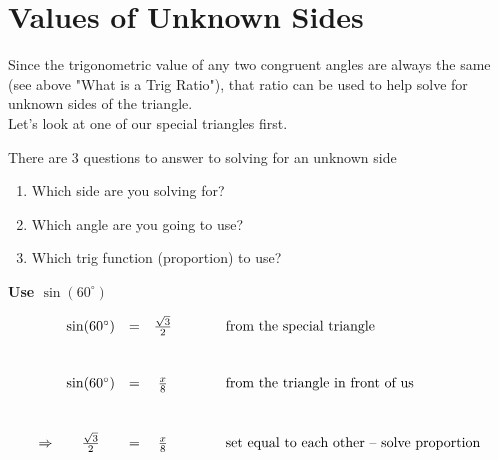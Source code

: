 \documentclass[12pt]{article}
\begin{document}
 \section*{Values of Unknown Sides}

Since the trigonometric value of any two congruent angles are always the same (see above "What is a Trig Ratio"), that ratio can be used to help solve for unknown sides of the triangle.\\

Let's look at one of our special triangles first.\\

\begin{center}
\end{center}

There are 3 questions to answer to solving for an unknown side\\

\begin{enumerate}

	\item Which side are you solving for?

	\item Which angle are you going to use?
	
	\item Which trig function (proportion) to use?\\
	

\end{enumerate}

\textbf{Use $\sin(60^\circ)$} 

\[
\begin{array}{c c c c l}
				&\sin(60^{\circ})	&		= & 	\frac{\sqrt{3}}{2}  & \hspace{1cm}\text{from the special triangle} \vspace{1cm} \\				
				&\sin(60^{\circ})	&		= & 	\frac{x}{8}  	& \hspace{1cm}  \text{from the triangle in front of us}\vspace{1cm} \\
				
	\Rightarrow &\frac{\sqrt{3}}{2}	&		= &		\frac{x}{8} 		& \hspace{1cm} \text{set equal to each other -- solve proportion} \\
\end{array}
\]
\end{document}
